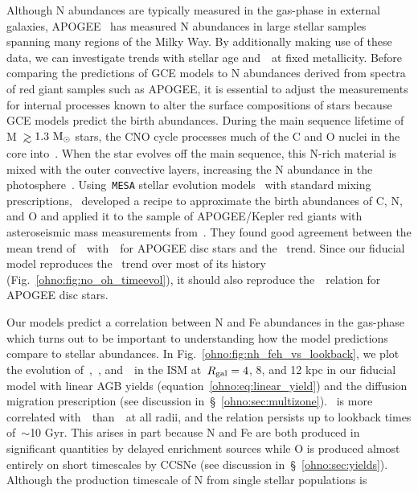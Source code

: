 Although N abundances are typically measured in the gas-phase in external
galaxies, APOGEE~\citep{Majewski2017} has measured N abundances in large
stellar samples spanning many regions of the Milky Way.
By additionally making use of these data, we can investigate trends with
stellar age and~\ofe~at fixed metallicity.
Before comparing the predictions of GCE models to N abundances derived from
spectra of red giant samples such as APOGEE, it is essential to adjust the
measurements for internal processes known to alter the surface compositions of
stars because GCE models predict the birth abundances.
During the main sequence lifetime of M~$\gtrsim 1.3~\msun$ stars, the CNO cycle
processes much of the C and O nuclei in the core into~\Nfourteen.
When the star evolves off the main sequence, this N-rich material is mixed with
the outer convective layers, increasing the N abundance in the
photosphere~\citep{Gilroy1989, Korn2007, Lind2008, Souto2018, Souto2019}.
Using~\texttt{MESA} stellar evolution models~\citep{Paxton2011, Paxton2013,
Paxton2015, Paxton2018} with standard mixing prescriptions,~\citet{Vincenzo2021b}
developed a recipe to approximate the birth abundances of C, N, and O and
applied it to the sample of APOGEE/Kepler red giants with asteroseismic mass
measurements from~\citet{Miglio2021}.
They found good agreement between the mean trend of~\no~with~\oh~for APOGEE
disc stars and the~\citet{Dopita2016} trend.
Since our fiducial model reproduces the~\citet{Dopita2016} trend over most of
its history (Fig.~\ref{ohno:fig:no_oh_timeevol}), it should also reproduce
the~\ohno~relation for APOGEE disc stars.
\par
Our models predict a correlation between N and Fe abundances in
the gas-phase which turns out to be important to understanding how the model
predictions compare to stellar abundances.
In Fig.~\ref{ohno:fig:nh_feh_vs_lookback}, we plot the evolution of~\nh,~\oh,
and~\feh~in the ISM at~$R_\text{gal} = 4$, 8, and 12 kpc in our fiducial model with
linear AGB yields (equation~\ref{ohno:eq:linear_yield}) and the diffusion migration
prescription (see discussion in~\S~\ref{ohno:sec:multizone}).
\nh~is more correlated with~\feh~than~\oh~at all radii, and the relation
persists up to lookback times of~$\sim$10 Gyr.
This arises in part because N and Fe are both produced in significant
quantities by delayed enrichment sources while O is produced almost entirely on
short timescales by CCSNe (see discussion in~\S~\ref{ohno:sec:yields}).
Although the production timescale of N from single stellar populations is
